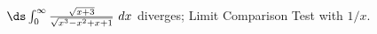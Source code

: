 {$\ds \int_{0}^\infty \frac{\sqrt{x+3}}{\sqrt{x^3-x^2+x+1}} \ dx$}
{diverges; Limit Comparison Test with $1/x$.}
